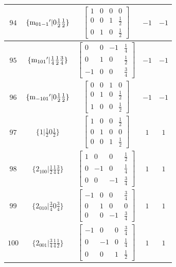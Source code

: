 \documentclass[fleqn,8pt]{jsarticle}
\begin{document}
\begin{longtable}{ccccc}
$ 94 $ & $ \{{\rm m}_{01-1}{}'|0 \frac{1}{2} \frac{1}{2}\} $ & $ \begin{bmatrix} 1 & 0 & 0 & 0 \\ 0 & 0 & 1 & \frac{1}{2} \\ 0 & 1 & 0 & \frac{1}{2} \end{bmatrix} $ & $ -1 $ & $ -1 $ \\ \hline
$ 95 $ & $ \{{\rm m}_{101}{}'|\frac{1}{4} \frac{1}{2} \frac{3}{4}\} $ & $ \begin{bmatrix} 0 & 0 & -1 & \frac{1}{4} \\ 0 & 1 & 0 & \frac{1}{2} \\ -1 & 0 & 0 & \frac{3}{4} \end{bmatrix} $ & $ -1 $ & $ -1 $ \\ \hline
$ 96 $ & $ \{{\rm m}_{-101}{}'|0 \frac{1}{2} \frac{1}{2}\} $ & $ \begin{bmatrix} 0 & 0 & 1 & 0 \\ 0 & 1 & 0 & \frac{1}{2} \\ 1 & 0 & 0 & \frac{1}{2} \end{bmatrix} $ & $ -1 $ & $ -1 $ \\ \hline
$ 97 $ & $ \{1|\frac{1}{2} 0 \frac{1}{2}\} $ & $ \begin{bmatrix} 1 & 0 & 0 & \frac{1}{2} \\ 0 & 1 & 0 & 0 \\ 0 & 0 & 1 & \frac{1}{2} \end{bmatrix} $ & $ 1 $ & $ 1 $ \\ \hline
$ 98 $ & $ \{2{}_{100}|\frac{1}{2} \frac{1}{4} \frac{3}{4}\} $ & $ \begin{bmatrix} 1 & 0 & 0 & \frac{1}{2} \\ 0 & -1 & 0 & \frac{1}{4} \\ 0 & 0 & -1 & \frac{3}{4} \end{bmatrix} $ & $ 1 $ & $ 1 $ \\ \hline
$ 99 $ & $ \{2{}_{010}|\frac{3}{4} 0 \frac{3}{4}\} $ & $ \begin{bmatrix} -1 & 0 & 0 & \frac{3}{4} \\ 0 & 1 & 0 & 0 \\ 0 & 0 & -1 & \frac{3}{4} \end{bmatrix} $ & $ 1 $ & $ 1 $ \\ \hline
$ 100 $ & $ \{2{}_{001}|\frac{3}{4} \frac{1}{4} \frac{1}{2}\} $ & $ \begin{bmatrix} -1 & 0 & 0 & \frac{3}{4} \\ 0 & -1 & 0 & \frac{1}{4} \\ 0 & 0 & 1 & \frac{1}{2} \end{bmatrix} $ & $ 1 $ & $ 1 $ \\ \hline

\end{longtable}
\end{document}
